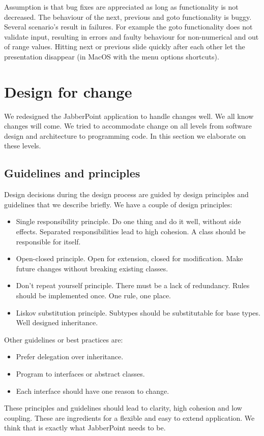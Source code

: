 \documentclass[a4paper]{article}
\begin{document}
Assumption is that bug fixes are appreciated as long as functionality is not decreased. The behaviour of the next, previous and goto functionality is buggy. Several scenario's result in failures. For example the goto functionality does not validate input, resulting in errors and faulty behaviour for non-numerical and out of range values. Hitting next or previous slide quickly after each other let the presentation disappear (in MacOS with the menu options shortcuts).   

\section{Design for change}
We redesigned the JabberPoint application to handle changes well. We all know changes will come. We tried to accommodate change on all levels from software design and architecture to programming code. In this section we elaborate on these levels.

\subsection{Guidelines and principles} 
Design decisions during the design process are guided by design principles and guidelines that we describe briefly.
We have a couple of design principles:
\begin{itemize}
\item Single responsibility principle. Do one thing and do it well, without side effects. Separated responsibilities lead to high cohesion. A class should be responsible for itself.
\item Open-closed principle. Open for extension, closed for modification. Make future changes without breaking existing classes.
\item Don't repeat yourself principle. There must be a lack of redundancy. Rules should be implemented once. One rule, one place.
\item Liskov substitution principle. Subtypes should be substitutable for base types. Well designed inheritance. 
\end{itemize}

Other guidelines or best practices are:
\begin{itemize}
\item Prefer delegation over inheritance.
\item Program to interfaces or abstract classes.
\item Each interface should have one reason to change.
\end{itemize}
These principles and guidelines should lead to clarity, high cohesion and low coupling. These are ingredients for a flexible and easy to extend application. We think that is exactly what JabberPoint needs to be. 
\end{document}

